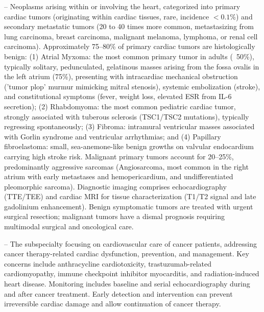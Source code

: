 -- Neoplasms arising within or involving the heart, categorized into primary cardiac tumors (originating within cardiac tissues, rare, incidence $<0.1\%$) and secondary metastatic tumors (20 to 40 times more common, metastasizing from lung carcinoma, breast carcinoma, malignant melanoma, lymphoma, or renal cell carcinoma). Approximately 75--80\% of primary cardiac tumors are histologically benign: (1) Atrial Myxoma: the most common primary tumor in adults (~50\%), typically solitary, pedunculated, gelatinous masses arising from the fossa ovalis in the left atrium (75\%), presenting with intracardiac mechanical obstruction ('tumor plop' murmur mimicking mitral stenosis), systemic embolization (stroke), and constitutional symptoms (fever, weight loss, elevated ESR from IL-6 secretion); (2) Rhabdomyoma: the most common pediatric cardiac tumor, strongly associated with tuberous sclerosis (TSC1/TSC2 mutations), typically regressing spontaneously; (3) Fibroma: intramural ventricular masses associated with Gorlin syndrome and ventricular arrhythmias; and (4) Papillary fibroelastoma: small, sea-anemone-like benign growths on valvular endocardium carrying high stroke risk. Malignant primary tumors account for 20--25\%, predominantly aggressive sarcomas (Angiosarcoma, most common in the right atrium with early metastases and hemopericardium, and undifferentiated pleomorphic sarcoma). Diagnostic imaging comprises echocardiography (TTE/TEE) and cardiac MRI for tissue characterization (T1/T2 signal and late gadolinium enhancement). Benign symptomatic tumors are treated with urgent surgical resection; malignant tumors have a dismal prognosis requiring multimodal surgical and oncological care.

-- The subspecialty focusing on cardiovascular care of cancer patients, addressing cancer therapy-related cardiac dysfunction, prevention, and management. Key concerns include anthracycline cardiotoxicity, trastuzumab-related cardiomyopathy, immune checkpoint inhibitor myocarditis, and radiation-induced heart disease. Monitoring includes baseline and serial echocardiography during and after cancer treatment. Early detection and intervention can prevent irreversible cardiac damage and allow continuation of cancer therapy.

